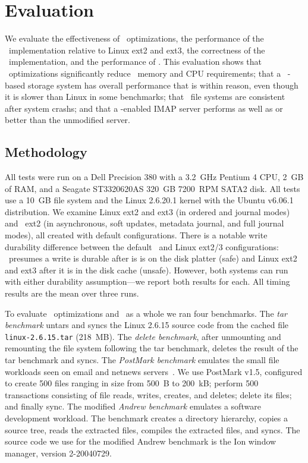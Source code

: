 \section {Evaluation}
\label{sec:evaluation}

We evaluate
%
the effectiveness of \patch\ optimizations,
%
the performance of the \Kudos\ implementation relative to Linux ext2
and ext3,
%
the correctness of the \Kudos\ implementation,
%
and the performance of \patchgroups.
%
This evaluation shows
%
that \patch\ optimizations significantly reduce \patch\ memory and CPU
requirements;
%
that a \Kudos\ \patch-based storage system has overall performance
that is within reason, even though it is slower than Linux in some
benchmarks;
%
that \Kudos\ file systems are consistent after system crashs;
%
and that a \patchgroup-enabled IMAP server performs as well as or
better than the unmodified server.

\subsection{Methodology}

All tests were run on a Dell Precision 380 with a 3.2~GHz Pentium 4
CPU, 2~GB of RAM, and a Seagate ST3320620AS 320~GB 7200~RPM SATA2 disk.
%
All tests use a 10~GB file system and the Linux 2.6.20.1 kernel
with the Ubuntu v6.06.1 distribution.
%
We examine Linux ext2 and ext3 (in ordered and journal modes) and
\Kudos\ ext2 (in asynchronous, soft updates, metadata journal, and
full journal modes), all created with default configurations.
%
There is a notable write durability difference between the default
\Kudos\ and Linux ext2/3 configurations: \Kudos\ presumes a write is
durable after is is on the disk platter (safe) and Linux ext2 and ext3
after it is in the disk cache (unsafe). However, both systems can run
with either durability assumption---we report both results for each.
%
All timing results are the mean over three runs.

To evaluate \patch\ optimizations and \Kudos\ as a whole we ran four
benchmarks.
%
The \emph{tar benchmark} untars and syncs the Linux 2.6.15 source code
from the cached file \texttt{linux-2.6.15.tar} (218~MB).
%
The \emph{delete benchmark}, after unmounting and remounting the file
system following the tar benchmark, deletes the result of the tar
benchmark and syncs.
%
The \emph{PostMark benchmark} emulates the small file workloads seen
on email and netnews servers~\cite{postmark}. We use PostMark v1.5,
configured to create 500 files ranging in size from 500~B to 200~kB;
perform 500 transactions consisting of file reads, writes, creates,
and deletes; delete its files; and finally sync.
%
The modified \emph{Andrew benchmark} emulates a software development
workload.  The benchmark creates a directory hierarchy, copies a
source tree, reads the extracted files, compiles the extracted files,
and syncs. The source code we use for the modified Andrew benchmark is
the Ion window manager, version 2-20040729.

